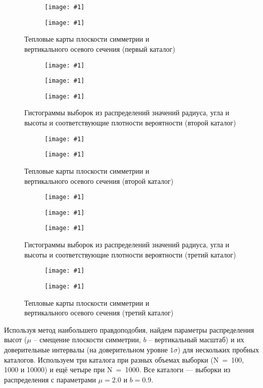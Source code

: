 \documentclass[a4paper, oneside]{article}
\newlength{\imagewidth}
\newlength{\imageheight}
\newcommand{\subgraphics}[1]{
\settowidth{\imagewidth}{\texttt{[image: \#1]}}%
\begin{subfigure}{\imagewidth}%
    \texttt{[image: \#1]}%
\end{subfigure}%
}
\begin{document}
\begin{figure}[h!]
  \centering
  \setlength{\imageheight}{5.1cm}
  \subgraphics{exponential_disk/1/Heatmap Symmetry Plane}
  \subgraphics{exponential_disk/1/Heatmap Vertical Cut}
  \caption{Тепловые карты плоскости симметрии и \\ вертикального осевого сечения (первый каталог)}
\end{figure}

\newpage

\begin{figure}[h!]
  \centering
  \setlength{\imageheight}{4.07cm}
  \subgraphics{exponential_disk/2/Histogram R}
  \subgraphics{exponential_disk/2/Histogram θ}
  \subgraphics{exponential_disk/2/Histogram Z}
  \caption{Гистограммы выборок из распределений значений радиуса, угла и высоты и соответствующие плотности вероятности (второй каталог)}
\end{figure}

\begin{figure}[h!]
  \centering
  \setlength{\imageheight}{5.1cm}
  \subgraphics{exponential_disk/2/Heatmap Symmetry Plane}
  \subgraphics{exponential_disk/2/Heatmap Vertical Cut}
  \caption{Тепловые карты плоскости симметрии и \\ вертикального осевого сечения (второй каталог)}
\end{figure}

\begin{figure}[h!]
  \centering
  \setlength{\imageheight}{4.07cm}
  \subgraphics{exponential_disk/3/Histogram R}
  \subgraphics{exponential_disk/3/Histogram θ}
  \subgraphics{exponential_disk/3/Histogram Z}
  \caption{Гистограммы выборок из распределений значений радиуса, угла и высоты и соответствующие плотности вероятности (третий каталог)}
\end{figure}

\newpage

\begin{figure}[h!]
  \centering
  \setlength{\imageheight}{5.1cm}
  \subgraphics{exponential_disk/3/Heatmap Symmetry Plane}
  \subgraphics{exponential_disk/3/Heatmap Vertical Cut}
  \caption{Тепловые карты плоскости симметрии и \\ вертикального осевого сечения (третий каталог)}
\end{figure}

Используя метод наибольшего правдоподобия, найдем параметры распределения высот ($ \mu $ -- смещение плоскости симметрии, $ b $ -- вертикальный масштаб) и их доверительные интервалы (на доверительном уровне $ 1 \sigma $) для нескольких пробных каталогов. Используем три каталога при разных объемах выборки (N~=~100, 1000 и 10000) и ещё четыре при N~=~1000. Все каталоги --- выборки из распределения с параметрами $ \mu = 2.0 $ и $ b = 0.9 $.
\end{document}
